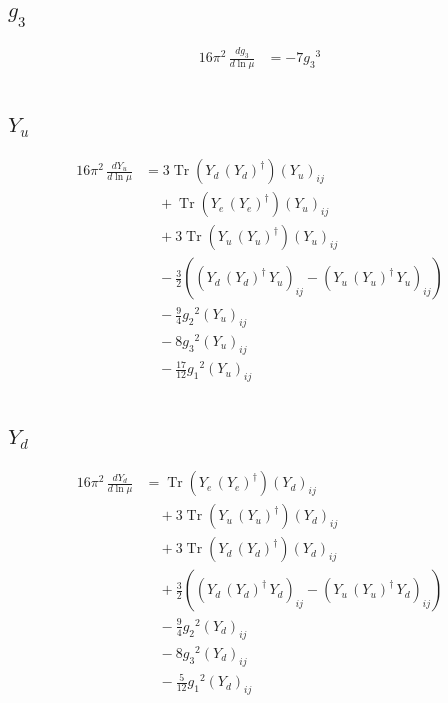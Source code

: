 \documentclass[10pt,a4paper]{article}
\begin{document}
\subsection*{$g_3$}
\begin{align*}
16\pi^2\,\frac{d g_3}{d\ln\mu} &=-7 {g_3}^3 \\
\end{align*}
\subsection*{$Y_u$}
\begin{align*}
16\pi^2\,\frac{d Y_u}{d\ln\mu} &=3 \operatorname{Tr}\!\left({Y_d}\,\left({Y_d}\right)^{\dagger}\right) \left({Y_u}\right)_{ij} \\
&\quad +\operatorname{Tr}\!\left({Y_e}\,\left({Y_e}\right)^{\dagger}\right) \left({Y_u}\right)_{ij} \\
&\quad +3 \operatorname{Tr}\!\left({Y_u}\,\left({Y_u}\right)^{\dagger}\right) \left({Y_u}\right)_{ij} \\
&\quad -\frac{3}{2} (\left({Y_d}\,\left({Y_d}\right)^{\dagger}\,{Y_u}\right)_{ij}-\left({Y_u}\,\left({Y_u}\right)^{\dagger}\,{Y_u}\right)_{ij}) \\
&\quad -\frac{9}{4} {g_2}^2 \left({Y_u}\right)_{ij} \\
&\quad -8 {g_3}^2 \left({Y_u}\right)_{ij} \\
&\quad -\frac{17}{12} {g_1}^2 \left({Y_u}\right)_{ij} \\
\end{align*}
\subsection*{$Y_d$}
\begin{align*}
16\pi^2\,\frac{d Y_d}{d\ln\mu} &=\operatorname{Tr}\!\left({Y_e}\,\left({Y_e}\right)^{\dagger}\right) \left({Y_d}\right)_{ij} \\
&\quad +3 \operatorname{Tr}\!\left({Y_u}\,\left({Y_u}\right)^{\dagger}\right) \left({Y_d}\right)_{ij} \\
&\quad +3 \operatorname{Tr}\!\left({Y_d}\,\left({Y_d}\right)^{\dagger}\right) \left({Y_d}\right)_{ij} \\
&\quad +\frac{3}{2} (\left({Y_d}\,\left({Y_d}\right)^{\dagger}\,{Y_d}\right)_{ij}-\left({Y_u}\,\left({Y_u}\right)^{\dagger}\,{Y_d}\right)_{ij}) \\
&\quad -\frac{9}{4} {g_2}^2 \left({Y_d}\right)_{ij} \\
&\quad -8 {g_3}^2 \left({Y_d}\right)_{ij} \\
&\quad -\frac{5}{12} {g_1}^2 \left({Y_d}\right)_{ij} \\
\end{align*}
\end{document}
